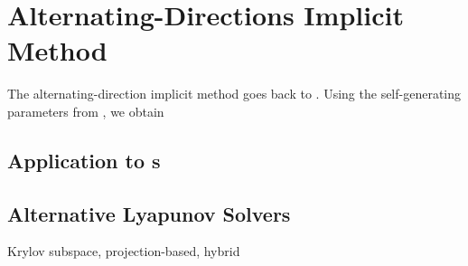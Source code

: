 \chapter{Alternating-Directions Implicit Method}

The alternating-direction implicit method goes back to \cite{Peaceman1955}.
Using the self-generating parameters from \cite{Kuerschner2016}, we obtain

\section{Application to s}
\section{Alternative Lyapunov Solvers}
Krylov subspace,
projection-based,
hybrid
